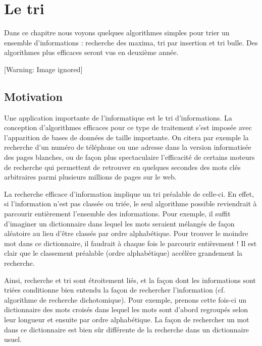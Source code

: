 \chapter[Le tri]{
Le tri}
{
Dans ce chapitre nous voyons quelques algorithmes simples pour trier un
ensemble d'informations : recherche des maxima, tri
par insertion et tri bulle. Des algorithmes plus efficaces seront vus
en deuxième année.}

\begin{center}
 [Warning: Image ignored] %

\end{center}
\section{Motivation}
{
Une application importante de l’informatique est le tri d’informations.
La conception d’algorithmes efficaces pour ce type de traitement s’est
imposée avec l’apparition de bases de données de taille importante. On
citera par exemple la recherche d’un numéro de téléphone ou une adresse
dans la version informatisée des pages blanches, ou de façon plus
spectaculaire l’efficacité de certains moteurs de recherche qui
permettent de retrouver en quelques secondes des mots clés arbitraires
parmi plusieurs millions de pages sur le web.}

{
La recherche efficace d’information implique un tri préalable de
celle-ci. En effet, si l’information n’est pas classée ou triée, le
seul algorithme possible reviendrait à parcourir entièrement l’ensemble
des informations. Pour exemple, il suffit d’imaginer un dictionnaire
dans lequel les mots seraient mélangés de façon aléatoire au lieu
d’être classés par ordre alphabétique. Pour trouver le moindre mot dans
ce dictionnaire, il faudrait à chaque fois le parcourir entièrement !
Il est clair que le classement préalable (ordre alphabétique) accélère
grandement la recherche.}

{
Ainsi, recherche et tri sont étroitement liés, et la façon dont les
informations sont triées conditionne bien entendu la façon de
rechercher l’information (cf. algorithme de recherche dichotomique).
Pour exemple, prenons cette fois-ci un dictionnaire des mots croisés
dans lequel les mots sont d’abord regroupés selon leur longueur et
ensuite par ordre alphabétique. La façon de rechercher un mot dans ce
dictionnaire est bien sûr différente de la recherche dans un
dictionnaire usuel. }

